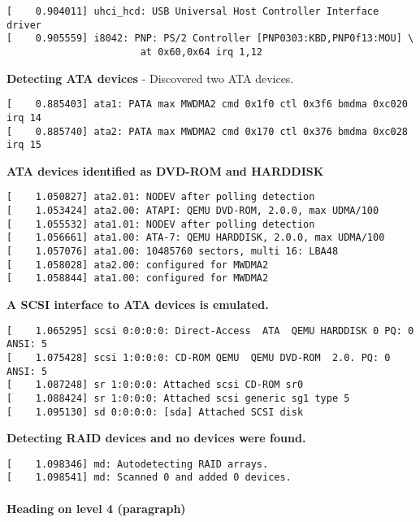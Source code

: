 \documentclass[paper=a4, fontsize=11pt]{scrartcl} %
\numberwithin{equation}{section} %
\numberwithin{figure}{section} %
\numberwithin{table}{section} %
\begin{document}
\begin{verbatim}
[    0.904011] uhci_hcd: USB Universal Host Controller Interface driver
[    0.905559] i8042: PNP: PS/2 Controller [PNP0303:KBD,PNP0f13:MOU] \
                       at 0x60,0x64 irq 1,12
\end{verbatim}

\textbf{Detecting ATA devices}  - Discovered two ATA devices.
\begin{verbatim}
[    0.885403] ata1: PATA max MWDMA2 cmd 0x1f0 ctl 0x3f6 bmdma 0xc020 irq 14
[    0.885740] ata2: PATA max MWDMA2 cmd 0x170 ctl 0x376 bmdma 0xc028 irq 15
\end{verbatim}

\textbf{ATA devices identified as DVD-ROM and HARDDISK}
\begin{verbatim}
[    1.050827] ata2.01: NODEV after polling detection
[    1.053424] ata2.00: ATAPI: QEMU DVD-ROM, 2.0.0, max UDMA/100
[    1.055532] ata1.01: NODEV after polling detection
[    1.056661] ata1.00: ATA-7: QEMU HARDDISK, 2.0.0, max UDMA/100
[    1.057076] ata1.00: 10485760 sectors, multi 16: LBA48
[    1.058028] ata2.00: configured for MWDMA2
[    1.058844] ata1.00: configured for MWDMA2
\end{verbatim}

\textbf{A SCSI interface to ATA devices is emulated.}
\begin{verbatim}
[    1.065295] scsi 0:0:0:0: Direct-Access  ATA  QEMU HARDDISK 0 PQ: 0 ANSI: 5
[    1.075428] scsi 1:0:0:0: CD-ROM QEMU  QEMU DVD-ROM  2.0. PQ: 0 ANSI: 5
[    1.087248] sr 1:0:0:0: Attached scsi CD-ROM sr0
[    1.088424] sr 1:0:0:0: Attached scsi generic sg1 type 5
[    1.095130] sd 0:0:0:0: [sda] Attached SCSI disk
\end{verbatim}

\textbf{Detecting RAID devices and no devices were found.}
\begin{verbatim}
[    1.098346] md: Autodetecting RAID arrays.
[    1.098541] md: Scanned 0 and added 0 devices.
\end{verbatim}





\paragraph{Heading on level 4 (paragraph)}

\lipsum[6] %


\end{document}
